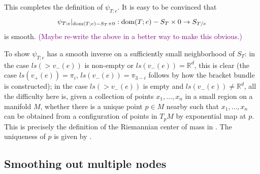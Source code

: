 \documentclass[11pt]{article}
\theoremstyle{definition}
\theoremstyle{remark}
\def\R{\mathbb{R}}
\def\cmt#1{\textcolor{purple}{(#1)}}
\def\tn#1{\textnormal{#1}}
\begin{document}
This completes the definition of $\psi_{T;e}$. 
It is easy to be convinced that  $$\psi_{T;e}|_{\tn{dom}(T;e)-S_T\times0}:\tn{dom}(T;e)-S_T\times0\to S_{T/e}$$
is smooth. 
\cmt{Maybe re-write the above in a better way to make this obvious.}

To show $\psi_{T;e}$ has a smooth inverse on a sufficiently small neighborhood of $S_T$: in the case $ls(>v_-(e))$ is non-empty or $ls(v_-(e))=\R^d$, this is clear (the case $ls(v_+(e))=\pi_i$, $ls(v_-(e))=\pi_{3-i}$ follows by how the bracket bundle is constructed); in the case $ls(>v_-(e))$ is empty and $ls(v_-(e))\neq\R^d$, all the difficulty here is, given a collection of points $x_1,\ldots,x_n$ in a small region on a manifold $M$, whether there is a unique point $p\in M$ nearby such that $x_1,\ldots,x_n$ can be obtained from a configuration of points in $T_pM$ by exponential map at $p$. This is precisely the definition of the Riemannian center of mass in \cite{GroveKarcher}. The uniqueness of $p$ is given by \cite[Proposition 3.1]{GroveKarcher}. 


\subsection{Smoothing out multiple nodes}
\end{document}
